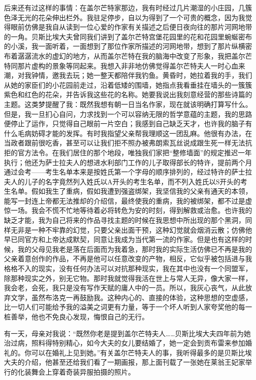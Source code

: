 \par 后来还有过这样的事情：在盖尔芒特家那边，我有时经过几片潮湿的小庄园，几簇色泽无光的花朵伸出栏外。我驻足停步，自以为得到了一个可贵的概念，因为我觉得眼前仿佛是我自从读到一位心爱的作家有关描述之后便日夜向往的那片河网地带的一角。贝斯比埃大夫曾同我们讲到了盖尔芒特宫堡花园里的花和花园里蜿蜒密布的小溪，我一面听着，一面想到了那位作家所描述的河网地带，想到了那片纵横密布着潺潺流水的虚幻的地方，从而盖尔芒特在我的脑海中改变了形象，我把盖尔芒特同那片虚构的景象等同起来。我想入非非地仿佛觉得盖尔芒特夫人一时心血来潮，对我钟情，邀我去玩；她一整天都陪伴我钓鱼。黄昏时，她拉着我的手，我们从她的家臣们的小花园前走过，沿着低矮的围墙，她指点我看垂挂在墙头的一簇簇紫色和红色的花朵，并告诉我这些花的名称。她要我说出我刻意经营的那些诗篇的主题。这类梦提醒了我：既然我想有朝一日当名作家，现在就该明确打算写什么。但是，我一旦扪心自问，力求找到一个可以容纳无限的哲学意蕴的主题，我的思路便停止了运作，只觉得自己眼前一片空白；我感到自己缺乏天才，也许我的脑子有什么毛病妨碍才能的发挥。有时我指望父亲帮我理顺这一团乱麻。他很有办法，在当政者跟前很吃香，甚至可以让我们拒不照办被弗朗索瓦丝说成跟生死一样无法抗拒的官方法令。在我们居住的那个地段，唯独我们家把“整修墙面”的规定推迟一年执行；他还为萨士拉夫人的想进水利部门工作的儿子取得部长的特许，提前两个月通过会考——考生名单本来是按姓氏第一个字母的顺序排列的，经过特许的萨士拉夫人的儿子的名字竟然列入姓氏以A开头的考生名单，而不列入姓氏以S开头的考生名单。假如我生了重病，假如我遭到强盗绑架，我坚信我的父亲有通天的本领，能写一封连上帝都无法推却的介绍信，最终使我的重病，我的被绑架，都不过是虚惊一场。我会不慌不忙地等待着必将转危为安的时刻，得到解救或治愈。也许我的缺乏才能，我为自己将来的作品寻找主题的时候在我思想中所出现的那个黑洞，同样无非是一种不牢靠的幻觉，只要父亲出面干预，这种幻觉就会烟消云散；仿佛他早已同官方和上帝达成默契，同意让我成为当代第一流的作家。但是也有这样的时候，我的父母见我老是落在后面而为我着急，那时我的实际生活仿佛已不再是我的父亲着意创作的作品，不再是他可以任意改变的产物，相反，它似乎被包括进与我格格不入的现实，没有任何办法可以对抗那种现实，我在其中也没有一个同盟军，除那种现实之外，别无它物。那时我就觉得我活在世上与常人无异，像大家一样，我会老，会死，我只是没有写作天赋的庸人中的一员。所以，我灰心丧气，从此放弃文学，虽然布洛克一再鼓励我。这种内心的、直接的体验，这种思想的空虚感，比一切人们可能给予我的溢美之词更有力量，等于一个坏人听到人家夸奖他的每一桩善举，他也不免良心发现，悔恨自己的无行。
\par 有一天，母亲对我说：“既然你老是提到盖尔芒特夫人……贝斯比埃大夫四年前为她治过病，照料得特别精心，如今大夫的女儿要结婚了，她一定会到贡布雷来参加婚礼的。你可以在婚礼上见到她。”有关盖尔芒特夫人的事，我听得最多的是贝斯比埃大夫的介绍，他甚至还给我们看了一期画报，那上面刊载了一张她在莱翁王妃家举行的化装舞会上穿着奇装异服拍摄的照片。
